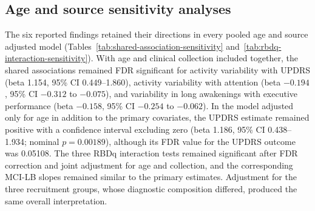 \documentclass[referee,pdflatex,sn-vancouver-num]{sn-jnl}
\begin{document}
\subsection{Age and source sensitivity analyses}\label{subsec:association-sensitivity}

The six reported findings retained their directions in every pooled age and
source adjusted model (Tables~\ref{tab:shared-association-sensitivity}
and~\ref{tab:rbdq-interaction-sensitivity}). With age and
clinical collection included together, the shared associations remained
FDR significant for activity variability with UPDRS (beta 1.154, 95\% CI 
0.449--1.860), activity variability with attention (beta $-0.194$, 95\% CI
$-0.312$ to $-0.075$), and variability in long awakenings with executive
performance (beta $-0.158$, 95\% CI $-0.254$ to $-0.062$). In the model adjusted only for age in addition to the primary covariates,
the UPDRS estimate remained positive with a confidence interval excluding
zero (beta 1.186, 95\% CI 0.438--1.934; nominal $p=0.00189$), although its
FDR value for the UPDRS outcome was 0.05108. The three RBDq interaction tests
remained significant after FDR correction and joint adjustment for age and collection,
and the corresponding MCI-LB slopes remained similar to the primary estimates.
Adjustment for the three recruitment groups, whose diagnostic composition differed, produced the
same overall interpretation.
\end{document}
